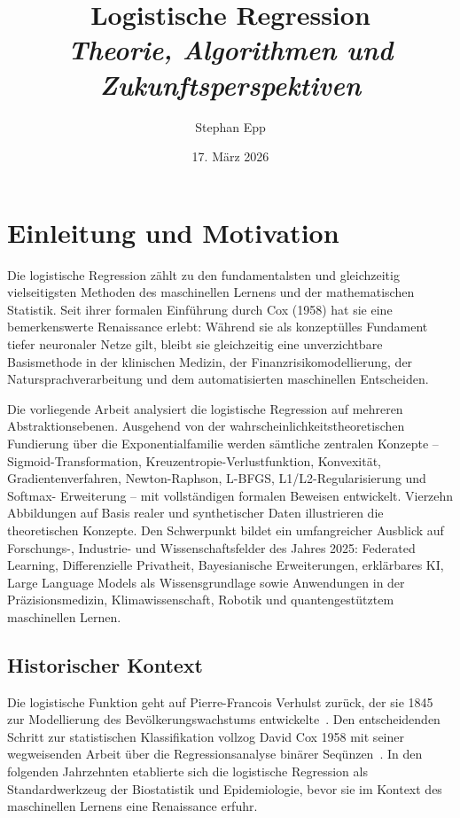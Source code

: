 ﻿\documentclass[12pt, a4paper]{article}
\title{\textbf{Logistische Regression}\\
	{\Large\itshape Theorie, Algorithmen und Zukunftsperspektiven}}
\author{Stephan Epp}
\date{17. März 2026}
\theoremstyle{definition}
\theoremstyle{remark}
\begin{document}

\maketitle
\tableofcontents
\newpage

\section{Einleitung und Motivation}

Die logistische Regression zählt zu den fundamentalsten und gleichzeitig vielseitigsten
Methoden des maschinellen Lernens und der mathematischen Statistik. Seit ihrer formalen
Einführung durch Cox (1958) hat sie eine bemerkenswerte Renaissance erlebt: Während sie
als konzeptülles Fundament tiefer neuronaler Netze gilt, bleibt sie gleichzeitig eine
unverzichtbare Basismethode in der klinischen Medizin, der Finanzrisikomodellierung, der
Natursprachverarbeitung und dem automatisierten maschinellen Entscheiden.

Die vorliegende Arbeit analysiert die logistische Regression auf mehreren Abstraktionsebenen.
Ausgehend von der wahrscheinlichkeitstheoretischen Fundierung über die Exponentialfamilie
werden sämtliche zentralen Konzepte -- Sigmoid-Transformation, Kreuzentropie-Verlustfunktion,
Konvexität, Gradientenverfahren, Newton-Raphson, L-BFGS, L1/L2-Regularisierung und Softmax-
Erweiterung -- mit vollständigen formalen Beweisen entwickelt. Vierzehn Abbildungen auf Basis
realer und synthetischer Daten illustrieren die theoretischen Konzepte. Den Schwerpunkt bildet
ein umfangreicher Ausblick auf Forschungs-, Industrie- und Wissenschaftsfelder des Jahres 2025:
Federated Learning, Differenzielle Privatheit, Bayesianische Erweiterungen, erklärbares KI,
Large Language Models als Wissensgrundlage sowie Anwendungen in der Präzisionsmedizin,
Klimawissenschaft, Robotik und quantengestütztem maschinellen Lernen.

\subsection{Historischer Kontext}

Die logistische Funktion geht auf Pierre-Francois Verhulst zurück, der sie 1845 zur Modellierung
des Bevölkerungswachstums entwickelte~\citep{verhulst1845recherches}. Den entscheidenden Schritt
zur statistischen Klassifikation vollzog David Cox 1958 mit seiner wegweisenden Arbeit über die
Regressionsanalyse binärer Seqünzen~\citep{cox1958regression}. In den folgenden Jahrzehnten
etablierte sich die logistische Regression als Standardwerkzeug der Biostatistik und
Epidemiologie, bevor sie im Kontext des maschinellen Lernens eine Renaissance erfuhr.
\end{document}
